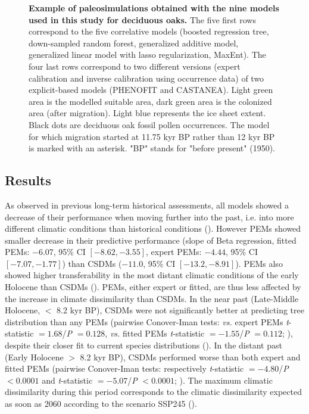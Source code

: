 \begin{figure}
\caption{\textbf{Example of paleosimulations obtained with the nine models used in this study for deciduous oaks.} The five first rows correspond to the five correlative models (boosted regression tree, down-sampled random forest, generalized additive model, generalized linear model with lasso regularization, MaxEnt). The four last rows correspond to two different versions (expert calibration and inverse calibration using occurrence data) of two explicit-based models (PHENOFIT and CASTANEA). Light green area is the modelled suitable area, dark green area is the colonized area (after migration). Light blue represents the ice sheet extent. Black dots are deciduous oak fossil pollen occurrences. The model for which migration started at 11.75 kyr BP rather than 12 kyr BP is marked with an asterisk. "BP" stands for "before present" (1950).}
\label{fig:quercusdeciduoussimulations}
\end{figure}

\subsection{Results}\label{results2}

As observed in previous long-term historical assessments, all models showed a decrease of their performance when moving further into the past, i.e. into more different climatic conditions than historical conditions (). However PEMs showed smaller decrease in their predictive performance (slope of Beta regression, fitted PEMs: $-6.07$, 95\% CI $[-8.62, -3.55]$, expert PEMs: $-4.44$, 95\% CI $[-7.07, -1.77]$) than CSDMs ($-11.0$, 95\% CI $[-13.2, -8.91]$). PEMs also showed higher transferability in the most distant climatic conditions of the early Holocene than CSDMs (). PEMs, either expert or fitted, are thus less affected by the increase in climate dissimilarity than CSDMs. In the near past (Late-Middle Holocene, $<$ 8.2 kyr BP), CSDMs were not significantly better at predicting tree distribution than any PEMs (pairwise Conover-Iman tests: \emph{vs.} expert PEMs \emph{t}-statistic $=1.68$/\emph{P} $=0.128$, \emph{vs.} fitted PEMs \emph{t}-statistic $=-1.55$/\emph{P} $=0.112$; ), despite their closer fit to current species distributions (). In the distant past (Early Holocene $>$ 8.2 kyr BP), CSDMs performed worse than both expert and fitted PEMs (pairwise Conover-Iman tests: respectively \emph{t}-statistic $=-4.80$/\emph{P} $<0.0001$ and \emph{t}-statistic $=-5.07$/\emph{P} $<0.0001$; ). The maximum climatic dissimilarity during this period corresponds to the climatic dissimilarity expected as soon as 2060 according to the scenario SSP245 ().

